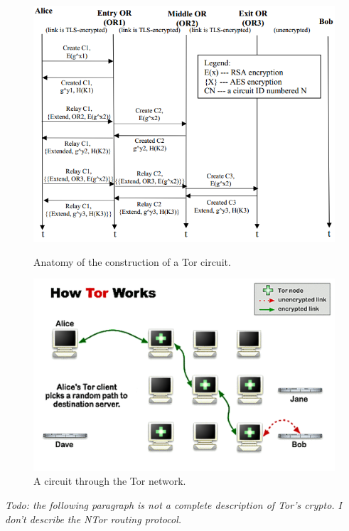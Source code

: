 \begin{figure}[htdp]
	\begin{minipage}[b]{0.45\linewidth}
		\centering
		\includegraphics[width=\textwidth]{images/circuit-construction.png}
		\caption{Anatomy of the construction of a Tor circuit.}
		\label{fig:figure1}
	\end{minipage}
	\hspace{0.5cm}
	\begin{minipage}[b]{0.45\linewidth}
		\centering
		\includegraphics[width=\textwidth]{images/circuit-building-2-5.png}
		\caption{A circuit through the Tor network.}
		\label{fig:figure2}
	\end{minipage}
\end{figure}

\textit{Todo: the following paragraph is not a complete description of Tor's crypto. I don't describe the NTor routing protocol.}

